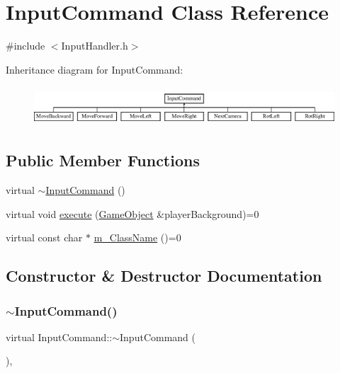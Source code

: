 \hypertarget{class_input_command}{}\section{Input\+Command Class Reference}
\label{class_input_command}


{\ttfamily \#include $<$Input\+Handler.\+h$>$}

Inheritance diagram for Input\+Command\+:\begin{figure}[H]
\begin{center}
\leavevmode
\includegraphics[height=1.481482cm]{class_input_command}
\end{center}
\end{figure}
\subsection*{Public Member Functions}
\begin{DoxyCompactItemize}
\item 
virtual \mbox{\hyperlink{class_input_command_a203385c2bfacb53d17ac5749ee274dc0}{$\sim$\+Input\+Command}} ()
\item 
virtual void \mbox{\hyperlink{class_input_command_a14fb500713d0813165f0c864d47553a0}{execute}} (\mbox{\hyperlink{class_game_object}{Game\+Object}} \&player\+Background)=0
\item 
virtual const char $\ast$ \mbox{\hyperlink{class_input_command_aa28e1877f850c588b5a2dff8d41eb627}{m\+\_\+\+Class\+Name}} ()=0
\end{DoxyCompactItemize}


\subsection{Constructor \& Destructor Documentation}
\mbox{\label{class_input_command_a203385c2bfacb53d17ac5749ee274dc0}} 
\subsubsection{\texorpdfstring{$\sim$\+Input\+Command()}{~InputCommand()}}
{\footnotesize\ttfamily virtual Input\+Command\+::$\sim$\+Input\+Command (\begin{DoxyParamCaption}{ }\end{DoxyParamCaption})\hspace{0.3cm}{\ttfamily [inline]}, {\ttfamily [virtual]}}

